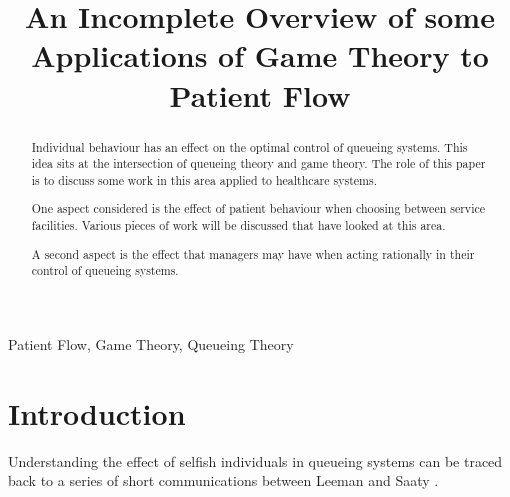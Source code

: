 \documentclass[a4paper,11pt]{article}
\title{An Incomplete Overview of some Applications of Game Theory to Patient Flow}
\begin{document}
\maketitle

\author{
}

\author{
}

\author{
}

\author{
}

\author{
}

\vspace{8mm}

\begin{abstract}
Individual behaviour has an effect on the optimal control of queueing systems.
This idea sits at the intersection of queueing theory and game theory.
The role of this paper is to discuss some work in this area applied to healthcare systems.

One aspect considered is the effect of patient behaviour when choosing between service facilities.
Various pieces of work will be discussed that have looked at this area.

A second aspect is the effect that managers may have when acting rationally in their control of queueing systems.
\end{abstract}

\bigskip
\begin{keywords}
Patient Flow, Game Theory, Queueing Theory

\bigskip
{}
\end{keywords}


\newpage

\section{Introduction}

Understanding the effect of selfish individuals in queueing systems can be traced back to a series of short communications between Leeman \cite{Leeman1964,Leeman1965} and Saaty \cite{Saaty1965}.
\end{document}
